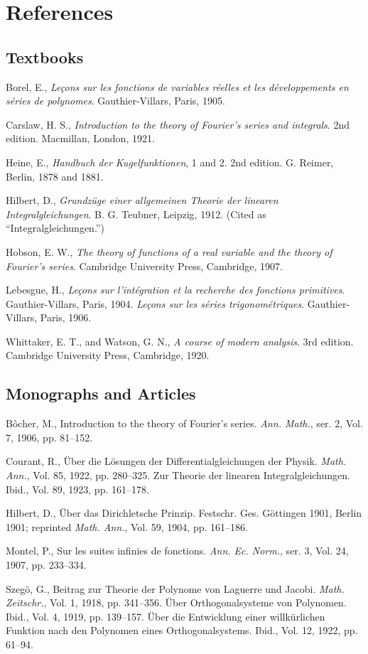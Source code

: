 \section*{References}
\subsection*{Textbooks}
Borel, E., \emph{Le\c{c}ons sur les fonctions de variables r\'eelles et les d\'eveloppements en s\'eries de polynomes}. Gauthier-Villars, Paris, 1905.

Carslaw, H. S., \emph{Introduction to the theory of Fourier's series and integrals}. 2nd edition. Macmillan, London, 1921.

Heine, E., \emph{Handbuch der Kugelfunktionen}, 1 and 2. 2nd edition. G. Reimer, Berlin, 1878 and 1881.

Hilbert, D., \emph{Grundz\"uge einer allgemeinen Theorie der linearen Integralgleichungen}. B. G. Teubner, Leipzig, 1912. (Cited as ``Integralgleichungen.'')

Hobson, E. W., \emph{The theory of functions of a real variable and the theory of Fourier's series}. Cambridge University Press, Cambridge, 1907.

Lebesgue, H., \emph{Le\c{c}ons sur l'int\'egration et la recherche des fonctions primitives}. Gauthier-Villars, Paris, 1904. \emph{Le\c{c}ons sur les s\'eries trigonom\'etriques}. Gauthier-Villars, Paris, 1906.

Whittaker, E. T., and Watson, G. N., \emph{A course of modern analysis}. 3rd edition. Cambridge University Press, Cambridge, 1920.

\subsection*{Monographs and Articles}
B\^ocher, M., Introduction to the theory of Fourier's series. \emph{Ann. Math.}, ser. 2, Vol. 7, 1906, pp. 81--152.

Courant, R., \"Uber die L\"osungen der Differentialgleichungen der Physik. \emph{Math. Ann.}, Vol. 85, 1922, pp. 280--325. Zur Theorie der linearen Integralgleichungen. Ibid., Vol. 89, 1923, pp. 161--178.

Hilbert, D., \"Uber das Dirichletsche Prinzip. Festschr. Ges. G\"ottingen 1901, Berlin 1901; reprinted \emph{Math. Ann.}, Vol. 59, 1904, pp. 161--186.

Montel, P., Sur les suites infinies de fonctions. \emph{Ann. Ec. Norm.}, ser. 3, Vol. 24, 1907, pp. 233--334.

Szeg\"o, G., Beitrag zur Theorie der Polynome von Laguerre und Jacobi. \emph{Math. Zeitschr.}, Vol. 1, 1918, pp. 341--356. \"Uber Orthogonalsysteme von Polynomen. Ibid., Vol. 4, 1919, pp. 139--157. \"Uber die Entwicklung einer willk\"urlichen Funktion nach den Polynomen eines Orthogonalsystems. Ibid., Vol. 12, 1922, pp. 61--94.
